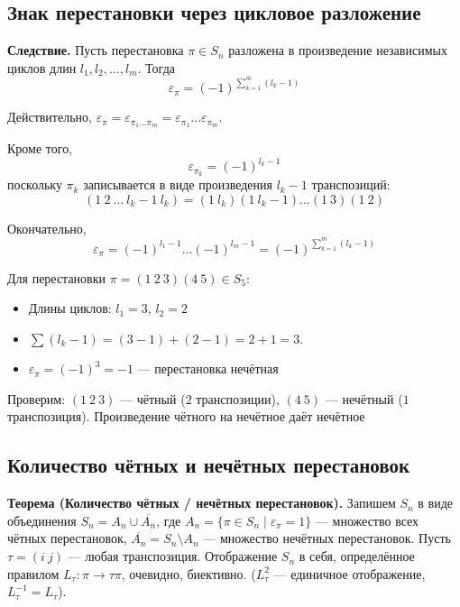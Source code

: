 \documentclass[a4paper,12pt]{article}
\theoremstyle{definition}
\theoremstyle{plain}
\theoremstyle{remark}
\begin{document}
	\subsection{Знак перестановки через цикловое разложение}
	
	\noindent \textbf{Следствие.}
	Пусть перестановка $\pi \in S_n$ разложена в произведение независимых циклов длин $l_1, l_2, \dots, l_m$. Тогда
	\[
	\varepsilon_\pi = (-1)^{\sum_{k=1}^m (l_k - 1)}
	\]
	
	Действительно, $\varepsilon_\pi = \varepsilon_{\pi_1 \dots \pi_m} = \varepsilon_{\pi_1} \dots \varepsilon_{\pi_m}$.
	
	Кроме того,
	\[
	\varepsilon_{\pi_k} = (-1)^{l_k - 1}
	\]
	поскольку $\pi_k$ записывается в виде произведения $l_k - 1$ транспозиций:
	\[
	(1\ 2\ \dots\ l_k-1\ l_k) = (1\ l_k)(1\ l_k-1)\dots(1\ 3)(1\ 2)
	\]
	
	Окончательно,
	\[
	\varepsilon_\pi = (-1)^{l_1-1} \dots (-1)^{l_m-1} = (-1)^{\sum_{k=1}^m (l_k - 1)}
	\]
	
	\begin{tcolorbox}[colback=blue!5, colframe=blue!40!black, title=Пример]
		Для перестановки $\pi = (1\ 2\ 3)(4\ 5) \in S_5$:
		\begin{itemize}
			\item Длины циклов: $l_1 = 3$, $l_2 = 2$
			\item $\sum (l_k - 1) = (3-1) + (2-1) = 2 + 1 = 3$.
			\item $\varepsilon_\pi = (-1)^3 = -1$ — перестановка нечётная
		\end{itemize}
		Проверим: $(1\ 2\ 3)$ — чётный ($2$ транспозиции), $(4\ 5)$ — нечётный ($1$ транспозиция). Произведение чётного на нечётное даёт нечётное
	\end{tcolorbox}
	
	\subsection{Количество чётных и нечётных перестановок}
	
	\noindent \textbf{Теорема (Количество чётных / нечётных перестановок).}
	Запишем $S_n$ в виде объединения $S_n = A_n \cup \overline{A_n}$, где $A_n = \{\pi \in S_n \mid \varepsilon_\pi = 1\}$ — множество всех чётных перестановок, $\overline{A_n} = S_n \setminus A_n$ — множество нечётных перестановок. Пусть $\tau = (i\ j)$ — любая транспозиция. Отображение $S_n$ в себя, определённое правилом $L_\tau \colon \pi \to \tau \pi$, очевидно, биективно. ($L_\tau^2$ — единичное отображение, $L_\tau^{-1} = L_\tau$).
	
\end{document}
